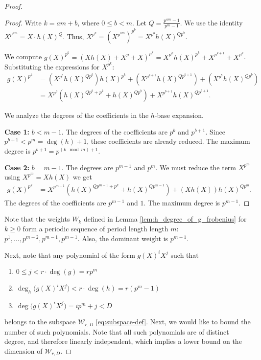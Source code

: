 \documentclass[11pt]{article}
\theoremstyle{plain}
\theoremstyle{definition}
\begin{document}
\begin{proof}
\begin{proof}
Write $k = am + b$, where $0 \leq b < m$. Let $Q = \frac{p^{am}-1}{p^m-1}$. We use the identity $X^{p^{am}} = X \cdot h(X)^Q$. Thus, $X^{p^k} = (X^{p^{am}})^{p^b} = X^{p^b} h(X)^{Q p^b}$.

We compute $g(X)^{p^k} = (X h(X) + X^p + X)^{p^k} = X^{p^k} h(X)^{p^k} + X^{p^{k+1}} + X^{p^k}$.
Substituting the expressions for $X^{p^k}$:
\begin{align*}
g(X)^{p^k} &= \left(X^{p^b} h(X)^{Q p^b}\right) h(X)^{p^k} + \left(X^{p^{b+1}} h(X)^{Q p^{b+1}}\right) + \left(X^{p^b} h(X)^{Q p^b}\right) \\
&= X^{p^b} \left( h(X)^{Q p^b + p^k} + h(X)^{Q p^b} \right) + X^{p^{b+1}} h(X)^{Q p^{b+1}}.
\end{align*}

We analyze the degrees of the coefficients in the $h$-base expansion.

\textbf{Case 1:} $b < m-1$. The degrees of the coefficients are $p^b$ and $p^{b+1}$. Since $p^{b+1} < p^m = \deg(h)+1$, these coefficients are already reduced. The maximum degree is $p^{b+1} = p^{(k \mod m) + 1}$.

\textbf{Case 2:} $b = m-1$. The degrees are $p^{m-1}$ and $p^m$. We must reduce the term $X^{p^m}$ using $X^{p^m} = X h(X) $ we get 
\begin{align*}
g(X)^{p^k} &= X^{p^{m-1}} \left( h(X)^{Q p^{m-1} + p^k} + h(X)^{Q p^{m-1}} \right) + (X h(X) ) h(X)^{Q p^m}.
\end{align*}
The degrees of the coefficients are $p^{m-1}$ and $1$. The maximum degree is $p^{m-1}$.
\end{proof}

Note that the weights $W_k $ defined in Lemma \ref{lem:h_degree_of_g_frobenius} for $k\geq 0$ form a periodic sequence of period length length $m$: $p^1, \dots, p^{m-2}, p^{m-1}, p^{m-1}$. Also, the dominant weight is $p^{m-1}$. 

Next, note that any polynomial of the form $g(X)^iX^j$ such  that
\begin{enumerate}
    \item $ 0\leq j < r\cdot \deg (g)=rp^m$
    \item $ \deg_h\!\big(g(X)^i X^j\big) < r\cdot \deg (h)=r(p^m-1)$ 
        \item $\deg\!\big(g(X)^i X^j\big)=ip^m+j < D$
\end{enumerate}
belongs to the subspace $\mathcal{W}_{r,D}$ \eqref{eq:subspace-def}. Next, we would like to bound the number of such polynomials. Note that all such polynomials are of distinct degree, and therefore linearly independent, which implies a lower bound on the dimension of $\mathcal{W}_{r,D}.$


\end{proof}
\end{document}
